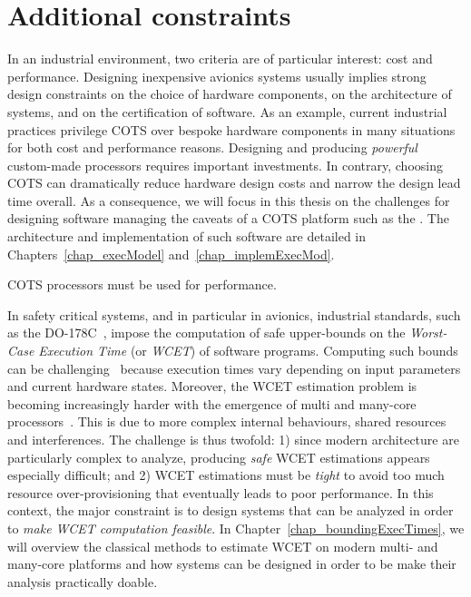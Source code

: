 \documentclass[main.tex]{subfiles}
\begin{document}
\section{Additional constraints}
\label{sec_systemModel_additionalConstraints}
In an industrial environment, two criteria are of particular interest: cost and performance. Designing inexpensive avionics systems usually implies strong design constraints on the choice of hardware components, 
on the architecture of systems, and on the certification of software. 
As an example, current industrial practices privilege COTS over bespoke hardware components in many situations for both cost and performance reasons. Designing and producing \emph{powerful} custom-made processors requires important investments. In contrary, choosing COTS can dramatically reduce hardware design costs and narrow the design lead time overall. As a consequence, we will focus in this thesis on the challenges for designing software managing the caveats of a COTS platform such as the \mppalong. The architecture and implementation of such software are detailed in Chapters~\ref{chap_execModel} and~\ref{chap_implemExecMod}. 

\begin{constraint}
    \label{constr_cotsOnly}
    COTS processors must be used for performance.
\end{constraint}


In safety critical systems, and in particular in avionics, industrial standards, such as the DO-178C~\cite{do178}, impose the computation of safe upper-bounds on the \emph{Worst-Case Execution Time} (or \emph{WCET}) of software programs. Computing such bounds can be challenging~\cite{Wilhelm2008} because execution times vary depending on input parameters and current hardware states. Moreover, the WCET estimation problem is becoming increasingly harder with the emergence of multi and many-core processors~\cite{Wilhelm2012}. This is due to more complex internal behaviours, shared resources and interferences. The challenge is thus twofold: 1) since modern architecture are particularly complex to analyze, producing \emph{safe} WCET estimations appears especially difficult; and 2) WCET estimations must be \emph{tight} to avoid too much resource over-provisioning that eventually leads to poor performance. In this context, the major constraint is to design systems that can be analyzed in order to \emph{make WCET computation feasible}. In Chapter~\ref{chap_boundingExecTimes}, we will overview the classical methods to estimate WCET on modern multi- and many-core platforms and how systems can be designed in order to be make their analysis practically doable.
\end{document}
